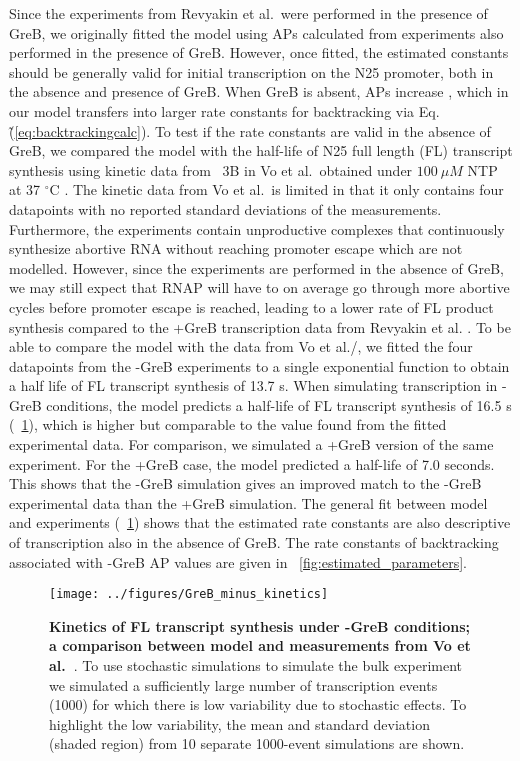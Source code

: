 Since the experiments from Revyakin et al.\ were performed in the presence of
GreB, we originally fitted the model using APs calculated from experiments
also performed in the presence of GreB. However, once fitted, the estimated
constants should be generally valid for initial transcription on the N25
promoter, both in the absence and presence of GreB. When GreB is absent, APs
increase \cite{hsu_initial_2006}, which in our model transfers into larger
rate constants for backtracking via Eq.\~(\ref{eq:backtrackingcalc}). To test
if the rate constants are valid in the absence of GreB, we compared the model
with the half-life of N25 full length (FL) transcript synthesis using kinetic
data from \FIG~3B in Vo et al.\, obtained under $100\ \mu M$ NTP at 37
$^{\circ}$C \cite{vo_vitro_2003-1}. The kinetic data from Vo et al.\ is
limited in that it only contains four datapoints with no reported standard
deviations of the measurements. Furthermore, the experiments contain
unproductive complexes that continuously synthesize abortive RNA without
reaching promoter escape \cite{vo_vitro_2003-1} which are not modelled.
However, since the experiments are performed in the absence of GreB, we may
still expect that RNAP will have to on average go through more abortive cycles
before promoter escape is reached, leading to a lower rate of FL product
synthesis compared to the +GreB transcription data from Revyakin et al.
\cite{revyakin_abortive_2006}. To be able to compare the model with the data
from Vo et al./, we fitted the four datapoints from the -GreB experiments to a
single exponential function to obtain a half life of FL transcript synthesis
of 13.7 s. When simulating transcription in -GreB conditions, the model
predicts a half-life of FL transcript synthesis of 16.5 s
(\FIG~\ref{fig:vo_comparison}), which is higher but comparable to the value
found from the fitted experimental data. For comparison, we simulated a +GreB
version of the same experiment. For the +GreB case, the model predicted a
half-life of 7.0 seconds. This shows that the -GreB simulation gives an
improved match to the -GreB experimental data  than the +GreB simulation. The
general fit between model and experiments (\FIG~\ref{fig:vo_comparison}) shows
that the estimated rate constants are also descriptive of transcription also
in the absence of GreB. The rate constants of backtracking associated with
-GreB AP values are given in \FIG~\ref{fig:estimated_parameters}.

\begin{figure}[h]
    \begin{center}
        \texttt{[image: ../figures/GreB\_minus\_kinetics]}
    \end{center}
    \caption{ {\bf Kinetics of FL transcript synthesis under -GreB conditions;
        a comparison between model and measurements from Vo
      et al.~\cite{vo_vitro_2003-1}}. To use stochastic simulations to
      simulate the bulk experiment we simulated a sufficiently large number of
      transcription events (1000) for which there is low variability due to
      stochastic effects. To highlight the low variability, the mean and
      standard deviation (shaded region) from 10 separate 1000-event
      simulations are shown.}
  \label{fig:vo_comparison}
\end{figure}

